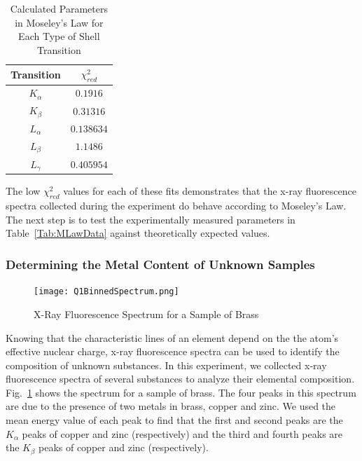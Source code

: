 \documentclass[%
 reprint,
 amsmath,amssymb,
 aps,
 pra,
]{revtex4-1}
\begin{document}
\begin{table}[htbp]
	\begin{center}
		\begin{tabular}{|c|c|}
			\hline Transition & $\chi_{red}^2$ \\
			\hline $K_{\alpha}$ & $0.1916$ \\
			\hline $K_{\beta}$ & $0.31316$ \\
			\hline $L_{\alpha}$ & $0.138634$ \\
			\hline $L_{\beta}$ & $1.1486$ \\
			\hline $L_{\gamma}$ & $0.405954$ \\
			\hline
		\end{tabular}
	\end{center}
	\caption{Calculated Parameters in Moseley's Law for Each Type of Shell Transition}
	\label{Tab:MLawChiSq}
\end{table}

The low $\chi_{red}^2$ values for each of these fits demonstrates that the x-ray fluorescence spectra collected during the experiment do behave according to Moseley's Law. The next step is to test the experimentally measured parameters in Table~\ref{Tab:MLawData} against theoretically expected values.

\subsubsection{Determining the Metal Content of Unknown Samples}

\begin{figure}[H]
	\centering
	\texttt{[image: Q1BinnedSpectrum.png]}
	\caption{X-Ray Fluorescence Spectrum for a Sample of Brass}
	\label{fig:brass_spectra}
\end{figure}

Knowing that the characteristic lines of an element depend on the the atom's effective nuclear charge, x-ray fluorescence spectra can be used to identify the composition of unknown substances. In this experiment, we collected x-ray fluorescence spectra of several substances to analyze their elemental composition. Fig.~\ref{fig:brass_spectra} shows the spectrum for a sample of brass. The four peaks in this spectrum are due to the presence of two metals in brass, copper and zinc. We used the mean energy value of each peak to find that the first and second peaks are the $K_{\alpha}$ peaks of copper and zinc (respectively) and the third and fourth peaks are the $K_{\beta}$ peaks of copper and zinc (respectively). 
\end{document}
